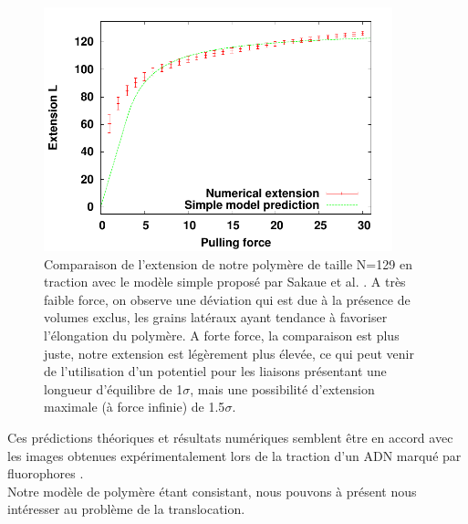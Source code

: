 \begin{figure}[H]
\begin{center}
\includegraphics[width=0.9\textwidth]{elongation.pdf}

\caption[Résultats numériques: élongations en traction]{Comparaison de l'extension de notre polymère de taille N=129 en traction avec le modèle simple proposé par Sakaue et al. \cite{Sakaue2012}. A très faible force, on observe une déviation qui est due à la présence de volumes exclus, les grains latéraux ayant tendance à favoriser l'élongation du polymère. A forte force, la comparaison est plus juste, notre extension est légèrement plus élevée, ce qui peut venir de l'utilisation d'un potentiel pour les liaisons présentant une longueur d'équilibre de 1$\sigma$, mais une possibilité d'extension maximale (à force infinie) de 1.5$\sigma$.}
\label{elongtraction}
\end{center}
\end{figure}


Ces prédictions théoriques et résultats numériques semblent être en accord avec les images obtenues expérimentalement lors de la traction d'un ADN marqué par fluorophores \cite{Wirtz1995}.\\

Notre modèle de polymère étant consistant, nous pouvons à présent nous intéresser au problème de la translocation.
